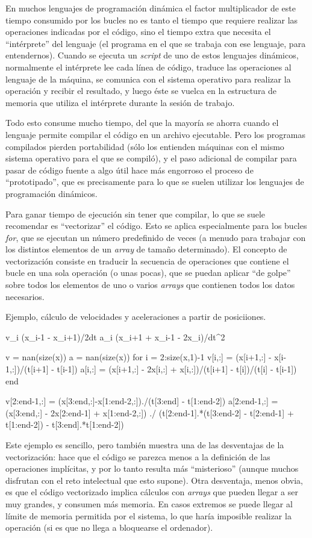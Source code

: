 ﻿\documentclass[spanish]{article}
\begin{document}
{{En muchos lenguajes de programación dinámica
el factor multiplicador de este tiempo consumido por los bucles no
es tanto el tiempo que requiere realizar las operaciones indicadas por
el código, sino el tiempo extra que necesita el ``intérprete'' del lenguaje
(el programa en el que se trabaja con ese lenguaje, para entendernos).
Cuando se ejecuta un \emph{script} de uno de estos lenguajes dinámicos,
normalmente el intérprete lee cada línea de código, traduce las operaciones al
lenguaje de la máquina, se comunica con el sistema operativo para
realizar la operación y recibir el resultado, y luego éste se vuelca en la
estructura de memoria que utiliza el intérprete durante la sesión de trabajo.

Todo esto consume mucho tiempo, del que la mayoría se ahorra cuando el lenguaje
permite compilar el código en un archivo ejecutable. Pero los programas
compilados pierden portabilidad (sólo los entienden máquinas con el
mismo sistema operativo para el que se compiló), y el paso adicional
de compilar para pasar de código fuente a algo útil hace más engorroso
el proceso de ``prototipado'', que es precisamente para lo que se suelen
utilizar los lenguajes de programación dinámicos.

Para ganar tiempo de ejecución sin tener que compilar, lo que se suele
recomendar es ``vectorizar'' el código. Esto se aplica especialmente para
los bucles \emph{for}, que se ejecutan un número predefinido de veces
(a menudo para trabajar con los distintos elementos de un \emph{array}
de tamaño determinado). El concepto de vectorización consiste en
traducir la secuencia de operaciones que contiene el bucle en una sola
operación (o unas pocas), que se puedan aplicar ``de golpe'' sobre todos los 
elementos de uno o varios \emph{arrays} que contienen todos los datos
necesarios.

Ejemplo, cálculo de velocidades y aceleraciones a partir de posiciiones.

v_i \approx (x_{i-1} - x_{i+1})/2dt
a_i \approx (x_i+1 + x_i-1 - 2x_i)/dt^2


v = nan(size(x))
a = nan(size(x))
for i = 2:size(x,1)-1
  v[i,:] = (x[i+1,:] - x[i-1,:])/(t[i+1] - t[i-1])
  a[i,:] = (x[i+1,:] - 2x[i,:] + x[i,:])/(t[i+1] - t[i])/(t[i] - t[i-1])
end

v[2:end-1,:] = (x[3:end,:]-x[1:end-2,:])./(t[3:end] - t[1:end-2])
a[2:end-1,:] = (x[3:end,:] - 2x[2:end-1] + x[1:end-2,:]) ./
  (t[2:end-1].*(t[3:end-2] - t[2:end-1] + t[1:end-2]) - t[3:end].*t[1:end-2])

Este ejemplo es sencillo, pero también muestra una de las desventajas de
la vectorización: hace que el código se parezca menos a la definición
de las operaciones implícitas, y por lo tanto resulta más ``misterioso''
(aunque muchos disfrutan con el reto intelectual que esto supone).
Otra desventaja, menos obvia, es que el código vectorizado implica
cálculos con \emph{arrays} que pueden llegar a ser muy grandes, y
consumen más memoria. En casos extremos se puede llegar al límite
de memoria permitida por el sistema, lo que haría imposible
realizar la operación (si es que no llega a bloquearse el ordenador).

}}
\end{document}
